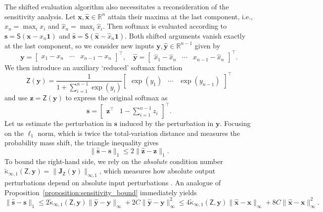 \documentclass[namedate,webpdf,imanum]{ima-authoring-template}
\newcommand{\Real}{\mathbb{R}}
\newcommand{\Matrix}[1]{\mathbf{#1}}
\newcommand{\trans}{\intercal}
\newcommand{\Norm}[3][]{#1\| #2 #1\|_{\mathrm{#3}}}
\newcommand{\One}{\Matrix{1}}
\newcommand{\Layer}[1]{\mathsf{#1}}
\newcommand{\condabs}[3][]{\tilde{\kappa}_{\mathrm{#2}} #1( #3 #1)}
\numberwithin{equation}{section}
\begin{document}
The shifted evaluation algorithm also necessitates a reconsideration of the sensitivity analysis.
Let $\Matrix{x}, \hat{\Matrix{x}} \in \Real^n$ attain their maxima at the last component, i.e., $x_n = \max_i x_i$ and $\hat{x}_n = \max_i \hat{x}_i$.
Then softmax is evaluated according to $\Matrix{s} = \Layer{S}(\Matrix{x} - x_n \One)$ and $\hat{\Matrix{s}} = \Layer{S}(\hat{\Matrix{x}} - \hat{x}_n \One)$.
Both shifted arguments vanish exactly at the last component, so we consider new inputs $\Matrix{y}, \hat{\Matrix{y}} \in \Real^{n-1}$ given by
\begin{equation*}
    \Matrix{y} = \begin{bmatrix}
        x_1 - x_n & \cdots & x_{n-1} - x_n
    \end{bmatrix}^\trans, \quad \hat{\Matrix{y}} = \begin{bmatrix}
        \hat{x}_1 - \hat{x}_n & \cdots & \hat{x}_{n-1} - \hat{x}_n
    \end{bmatrix}^\trans.
\end{equation*}
We then introduce an auxiliary `reduced' softmax function
\begin{equation*}
    \Layer{Z}(\Matrix{y}) = \frac{1}{1 + \sum_{i = 1}^{n-1} \exp(y_i)} \begin{bmatrix}
        \exp(y_1) & \cdots & \exp(y_{n-1})
    \end{bmatrix}^\trans
\end{equation*}
and use $\Matrix{z} = \Layer{Z}(\Matrix{y})$ to express the original softmax as
\begin{equation*}
    \Matrix{s} = \begin{bmatrix}
       \Matrix{z}^\trans & 1 - \sum_{i = 1}^{n-1} z_i
    \end{bmatrix}^\trans.
\end{equation*}
Let us estimate the perturbation in $\Matrix{s}$ induced by the perturbation in $\Matrix{y}$.
Focusing on the $\ell_1$ norm, which is twice the total-variation distance and measures the probability mass shift, the triangle inequality gives
\begin{equation*}
    \Norm{\hat{\Matrix{s}} - \Matrix{s}}{1} \leq 2 \Norm{\hat{\Matrix{z}} - \Matrix{z}}{1}.
\end{equation*}
To bound the right-hand side, we rely on the \emph{absolute} condition number $\condabs{\infty,1}{\Layer{Z}, \Matrix{y}} = \Norm{\Matrix{J}_{\Layer{Z}}(\Matrix{y})}{\infty,1}$, which measures how absolute output perturbations depend on absolute input perturbations \citep{rice1966theory}.
An analogue of Proposition~\ref{proposition:sensitivity_bound} immediately yields
\begin{equation*}
    \Norm{\hat{\Matrix{s}} - \Matrix{s}}{1} \leq 2\condabs{\infty,1}{\Layer{Z}, \Matrix{y}} \Norm{\hat{\Matrix{y}} - \Matrix{y}}{\infty} + 2C \Norm{\hat{\Matrix{y}} - \Matrix{y}}{\infty}^2 \leq 4\condabs{\infty,1}{\Layer{Z}, \Matrix{y}} \Norm{\hat{\Matrix{x}} - \Matrix{x}}{\infty} + 8C \Norm{\hat{\Matrix{x}} - \Matrix{x}}{\infty}^2.
\end{equation*}
\end{document}

